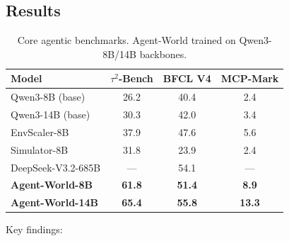 \documentclass[11pt]{article}
\begin{document}
\subsection{Results}

\begin{table}[h]
\centering
\caption{Core agentic benchmarks. Agent-World trained on Qwen3-8B/14B backbones.}
\begin{tabular}{lccc}
\toprule
\textbf{Model} & \textbf{$\tau^2$-Bench} & \textbf{BFCL V4} & \textbf{MCP-Mark} \\
\midrule
Qwen3-8B (base) & 26.2 & 40.4 & 2.4 \\
Qwen3-14B (base) & 30.3 & 42.0 & 3.4 \\
EnvScaler-8B & 37.9 & 47.6 & 5.6 \\
Simulator-8B & 31.8 & 23.9 & 2.4 \\
DeepSeek-V3.2-685B & --- & 54.1 & --- \\
\textbf{Agent-World-8B} & \textbf{61.8} & \textbf{51.4} & \textbf{8.9} \\
\textbf{Agent-World-14B} & \textbf{65.4} & \textbf{55.8} & \textbf{13.3} \\
\bottomrule
\end{tabular}
\end{table}

Key findings:
\end{document}
